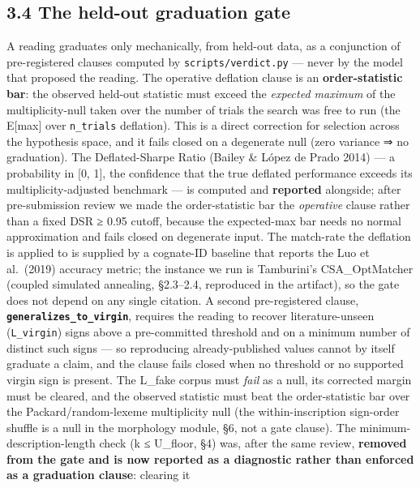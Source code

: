 \documentclass[
  10pt,
]{article}
\begin{document}
\hypertarget{the-held-out-graduation-gate}{%
\subsection{3.4 The held-out graduation
gate}\label{the-held-out-graduation-gate}}

A reading graduates only mechanically, from held-out data, as a
conjunction of pre-registered clauses computed by
\texttt{scripts/verdict.py} --- never by the model that proposed the
reading. The operative deflation clause is an \textbf{order-statistic
bar}: the observed held-out statistic must exceed the \emph{expected
maximum} of the multiplicity-null taken over the number of trials the
search was free to run (the E{[}max{]} over \texttt{n\_trials}
deflation). This is a direct correction for selection across the
hypothesis space, and it fails closed on a degenerate null (zero
variance ⇒ no graduation). The Deflated-Sharpe Ratio (Bailey \& López de
Prado 2014) --- a probability in {[}0, 1{]}, the confidence that the
true deflated performance exceeds its multiplicity-adjusted benchmark
--- is computed and \textbf{reported} alongside; after pre-submission
review we made the order-statistic bar the \emph{operative} clause
rather than a fixed DSR ≥ 0.95 cutoff, because the expected-max bar
needs no normal approximation and fails closed on degenerate input. The
match-rate the deflation is applied to is supplied by a cognate-ID
baseline that reports the Luo et al.~(2019) accuracy metric; the
instance we run is Tamburini's CSA\_OptMatcher (coupled simulated
annealing, §2.3--2.4, reproduced in the artifact), so the gate does not
depend on any single citation. A second pre-registered clause,
\textbf{\texttt{generalizes\_to\_virgin}}, requires the reading to
recover literature-unseen (\texttt{L\_virgin}) signs above a
pre-committed threshold and on a minimum number of distinct such signs
--- so reproducing already-published values cannot by itself graduate a
claim, and the clause fails closed when no threshold or no supported
virgin sign is present. The L\_fake corpus must \emph{fail} as a null,
its corrected margin must be cleared, and the observed statistic must
beat the order-statistic bar over the Packard/random-lexeme multiplicity
null (the within-inscription sign-order shuffle is a null in the
morphology module, §6, not a gate clause). The
minimum-description-length check (k ≤ U\_floor, §4) was, after the same
review, \textbf{removed from the gate and is now reported as a
diagnostic rather than enforced as a graduation clause}: clearing it
\end{document}

